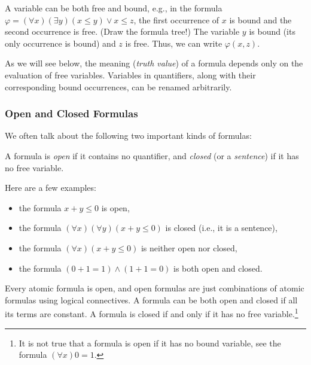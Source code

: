 \begin{example}
    A variable can be both free and bound, e.g., in the formula $\varphi=(\forall x)(\exists y)(x\leq y)\lor x\leq z$, the first occurrence of $x$ is bound and the second occurrence is free. (Draw the formula tree!) The variable $y$ is bound (its only occurrence is bound) and $z$ is free. Thus, we can write $\varphi(x,z)$.
\end{example}

\begin{remark}
    As we will see below, the meaning (\emph{truth value}) of a formula depends only on the evaluation of free variables. Variables in quantifiers, along with their corresponding bound occurrences, can be renamed arbitrarily.
\end{remark}


\subsubsection{Open and Closed Formulas}

We often talk about the following two important kinds of formulas:

\begin{definition}
A formula is \emph{open} if it contains no quantifier, and \emph{closed} (or a \emph{sentence}) if it has no free variable.
\end{definition}

\begin{example} Here are a few examples:
    \begin{itemize}
        \item the formula $x+y\leq 0$ is open,
        \item the formula $(\forall x)(\forall y)(x+y\leq 0)$ is closed (i.e., it is a sentence),
        \item the formula $(\forall x)(x+y\leq 0)$ is neither open nor closed,
        \item the formula $(0+1=1)\land (1+1=0)$ is both open and closed.
    \end{itemize}
\end{example}

Every atomic formula is open, and open formulas are just combinations of atomic formulas using logical connectives. A formula can be both open and closed if all its terms are constant. A formula is closed if and only if it has no free variable.\footnote{It is not true that a formula is open if it has no bound variable, see the formula $(\forall x)0=1$.}

